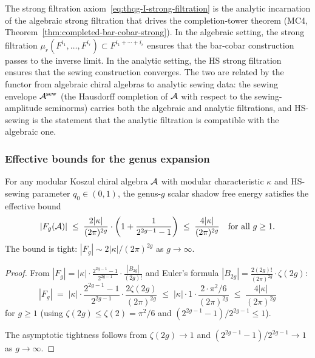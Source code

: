 \begin{remark}[Connection to MC4]
\label{rem:thqg-I-mc4-connection}
The strong filtration axiom~\eqref{eq:thqg-I-strong-filtration} is the analytic incarnation of the algebraic strong filtration that drives the completion-tower theorem (MC4, Theorem~\ref{thm:completed-bar-cobar-strong}). In the algebraic setting, the strong filtration $\mu_r(F^{i_1}, \ldots, F^{i_r}) \subset F^{i_1 + \cdots + i_r}$ ensures that the bar-cobar construction passes to the inverse limit. In the analytic setting, the HS strong filtration ensures that the sewing construction converges. The two are related by the functor from algebraic chiral algebras to analytic sewing data: the sewing envelope $\mathcal{A}^{\mathrm{sew}}$ (the Hausdorff completion of $\mathcal{A}$ with respect to the sewing-amplitude seminorms) carries both the algebraic and analytic filtrations, and HS-sewing is the statement that the analytic filtration is compatible with the algebraic one.
\end{remark}

\subsubsection{Effective bounds for the genus expansion}

\begin{proposition}
\label{prop:thqg-I-effective-bound}
For any modular Koszul chiral algebra $\mathcal{A}$ with modular
characteristic $\kappa$ and HS-sewing
parameter $q_0 \in (0,1)$, the genus-$g$ scalar shadow free energy
satisfies the effective bound
\begin{equation}\label{eq:thqg-I-effective-bound}
|F_g(\mathcal{A})| \;\leq\; \frac{2|\kappa|}{(2\pi)^{2g}} \cdot \left(1 + \frac{1}{2^{2g-1} - 1}\right) \;\leq\; \frac{4|\kappa|}{(2\pi)^{2g}} \quad\text{for all } g \geq 1.
\end{equation}
The bound is tight: $|F_g| \sim 2|\kappa|/(2\pi)^{2g}$ as $g \to \infty$.
\end{proposition}

\begin{proof}
From $|F_g| = |\kappa| \cdot \frac{2^{2g-1}-1}{2^{2g-1}} \cdot \frac{|B_{2g}|}{(2g)!}$ and Euler's formula $|B_{2g}| = \frac{2(2g)!}{(2\pi)^{2g}} \cdot \zeta(2g)$:
\[
|F_g| \;=\; |\kappa| \cdot \frac{2^{2g-1}-1}{2^{2g-1}} \cdot \frac{2\zeta(2g)}{(2\pi)^{2g}} \;\leq\; |\kappa| \cdot 1 \cdot \frac{2 \cdot \pi^2/6}{(2\pi)^{2g}} \;\leq\; \frac{4|\kappa|}{(2\pi)^{2g}}
\]
for $g \geq 1$ (using $\zeta(2g) \leq \zeta(2) = \pi^2/6$ and $(2^{2g-1}-1)/2^{2g-1} \leq 1$).

The asymptotic tightness follows from $\zeta(2g) \to 1$ and $(2^{2g-1}-1)/2^{2g-1} \to 1$ as $g \to \infty$.
\end{proof}

